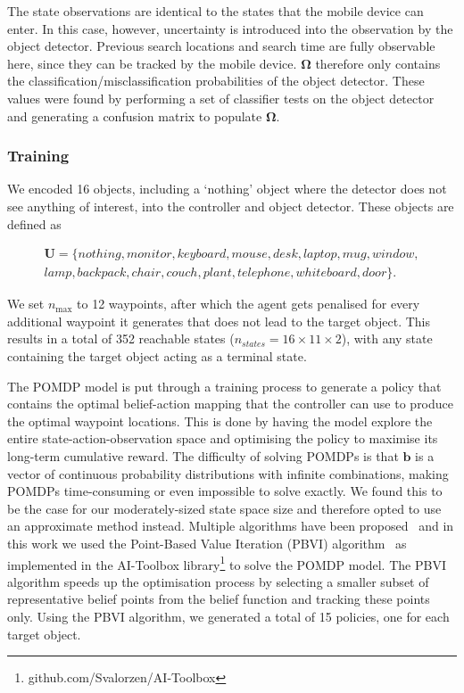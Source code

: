 \documentclass[runningheads]{llncs}
\begin{document}
The state observations are identical to the states that the mobile device can enter. 
In this case, however, uncertainty is introduced into the observation by the object detector.
Previous search locations and search time are fully observable here, since they can be tracked by the mobile device.
$\mathbf{\Omega}$ therefore only contains the classification/misclassification probabilities of the object detector. 
These values were found by performing a set of classifier tests on the object detector and generating a confusion matrix to populate $\mathbf{\Omega}$.

\subsubsection{Training}

We encoded 16 objects, including a `nothing' object where the detector does not see anything of interest, into the controller and object detector.
These objects are defined as 

\begin{equation*}
  \begin{split}
    \mathbf{U} = \{ nothing, monitor, keyboard, mouse, desk, laptop, mug, window,\\ 
      lamp, backpack, chair, couch, plant, telephone, whiteboard, door \}.
  \end{split}
\end{equation*}

\noindent We set $n_{\max}$ to 12 waypoints, after which the agent gets penalised for every additional waypoint it generates that does not lead to the target object. 
This results in a total of 352 reachable states ($n_{states} = 16\times11\times2$), with any state containing the target object acting as a terminal state.

The POMDP model is put through a training process to generate a policy that contains the optimal belief-action mapping that the controller can use to produce the optimal waypoint locations.
This is done by having the model explore the entire state-action-observation space and optimising the policy to maximise its long-term cumulative reward.
The difficulty of solving POMDPs is that $\mathbf{b}$ is a vector of continuous probability distributions with infinite combinations, making POMDPs time-consuming or even impossible to solve exactly.
We found this to be the case for our moderately-sized state space size and therefore opted to use an approximate method instead.
Multiple algorithms have been proposed~\cite{bargiacchi2016dynamic,silver2010monte} and in this work we used the Point-Based Value Iteration (PBVI) algorithm~\cite{pineau2003point} as implemented in the AI-Toolbox library\footnote{github.com/Svalorzen/AI-Toolbox} to solve the POMDP model.
The PBVI algorithm speeds up the optimisation process by selecting a smaller subset of representative belief points from the belief function and tracking these points only. 
Using the PBVI algorithm, we generated a total of 15 policies, one for each target object. 
\end{document}
